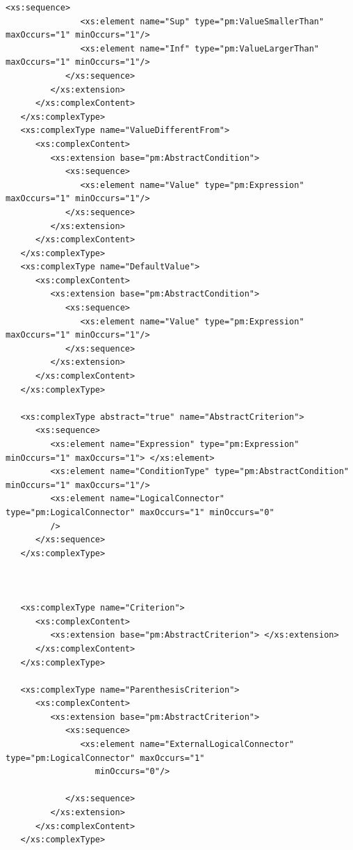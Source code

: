 \documentclass[a4paper,11pt] {ivoa}
\begin{document}
\begin{lstlisting}[style=listXML]
            <xs:sequence>
               <xs:element name="Sup" type="pm:ValueSmallerThan" maxOccurs="1" minOccurs="1"/>
               <xs:element name="Inf" type="pm:ValueLargerThan" maxOccurs="1" minOccurs="1"/>
            </xs:sequence>
         </xs:extension>
      </xs:complexContent>
   </xs:complexType>
   <xs:complexType name="ValueDifferentFrom">
      <xs:complexContent>
         <xs:extension base="pm:AbstractCondition">
            <xs:sequence>
               <xs:element name="Value" type="pm:Expression" maxOccurs="1" minOccurs="1"/>
            </xs:sequence>
         </xs:extension>
      </xs:complexContent>
   </xs:complexType>
   <xs:complexType name="DefaultValue">
      <xs:complexContent>
         <xs:extension base="pm:AbstractCondition">
            <xs:sequence>
               <xs:element name="Value" type="pm:Expression" maxOccurs="1" minOccurs="1"/>
            </xs:sequence>
         </xs:extension>
      </xs:complexContent>
   </xs:complexType>

   <xs:complexType abstract="true" name="AbstractCriterion">
      <xs:sequence>
         <xs:element name="Expression" type="pm:Expression" minOccurs="1" maxOccurs="1"> </xs:element>
         <xs:element name="ConditionType" type="pm:AbstractCondition" minOccurs="1" maxOccurs="1"/>
         <xs:element name="LogicalConnector" type="pm:LogicalConnector" maxOccurs="1" minOccurs="0"
         />
      </xs:sequence>
   </xs:complexType>



   <xs:complexType name="Criterion">
      <xs:complexContent>
         <xs:extension base="pm:AbstractCriterion"> </xs:extension>
      </xs:complexContent>
   </xs:complexType>

   <xs:complexType name="ParenthesisCriterion">
      <xs:complexContent>
         <xs:extension base="pm:AbstractCriterion">
            <xs:sequence>
               <xs:element name="ExternalLogicalConnector" type="pm:LogicalConnector" maxOccurs="1"
                  minOccurs="0"/>

            </xs:sequence>
         </xs:extension>
      </xs:complexContent>
   </xs:complexType>


\end{lstlisting}
\end{document}
